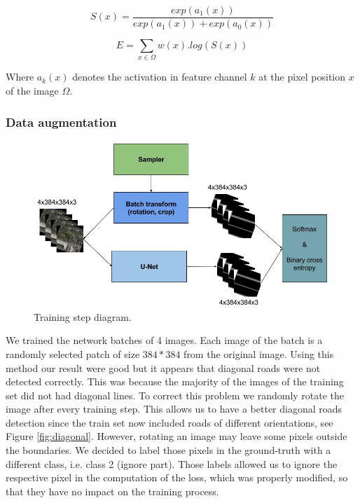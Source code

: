 \documentclass[10pt,conference,compsocconf]{IEEEtran}
\begin{document}
\begin{equation}
	S(x) = \frac{exp(a_1(x))}{exp(a_1(x))+exp(a_0(x))}
\end{equation}

\begin{equation}
	E = \sum\limits_{x \in \Omega} w(x).log(S(x))
\end{equation}

Where $a_k(x)$ denotes the activation in feature channel $k$ at the pixel position $x$ of the image $\Omega$.

\subsubsection*{Data augmentation}

\begin{figure}[h]
 \centering
 \includegraphics[width=0.7\columnwidth]{img/dataaug.png}
 \caption{Training step diagram.}
 \vspace{-3mm}
 \label{fig:denoise-fourier}
\end{figure}

We trained the network  batches of 4 images. Each image of the batch is a randomly selected patch of size $384*384$ from the original image. Using this method our result were good but it appears that diagonal roads were not detected correctly. This was because the majority of the images of the training set did not had diagonal lines. To correct this problem we randomly rotate the image after every training step. This allows us to have a better diagonal roads detection since the train set now included roads of different orientations, see Figure \ref{fig:diagonal}. However, rotating an image may leave some pixels outside the boundaries. We decided to label those pixels in the ground-truth with a different class, i.e. class 2 (ignore part). Those labels allowed us to ignore the respective pixel in the computation of the loss, which was properly modified, so that they have no impact on the training process.
\end{document}
